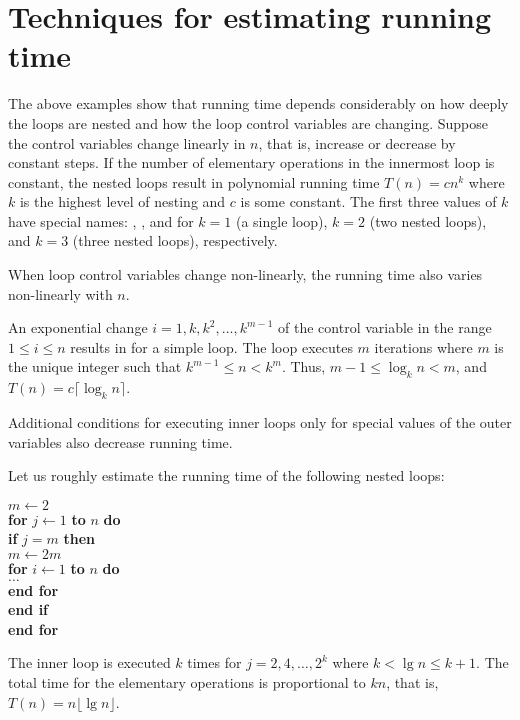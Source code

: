 \chapter{Techniques for estimating running time} %

The above examples show that running time depends considerably on how
deeply the loops are nested and how the loop control variables are
changing. Suppose the control variables change linearly in $n$, that
is, increase or decrease by constant steps. If the number of elementary
operations in the innermost loop is constant, the nested loops result
in polynomial running time $T(n) = c  n^{k}$ where $k$ is
the highest level of nesting and $c$ is some constant. The first three
values of $k$ have special names: , 
,
and  for $k=1$ (a single loop), $k=2$ (two nested
loops), and $k=3$ (three nested loops), respectively.

When loop control variables change non-linearly,
the running time also varies non-linearly with $n$.

\begin{Example} 
An exponential change \(i=1,k,k^2 ,\ldots, k^{m-1}\) of
the control variable  in the
range \(1 \le i \le n\) results in 
for a simple loop. The loop executes $m$ 
iterations where $m$ is the unique integer such that $k^{m-1} \le  n  < k^{m}$. Thus, $m-1 \le \log_{k} n
< m$, and $T(n) = c  \lceil \log_{k} n \rceil$.
\end{Example}
 
Additional conditions for executing inner loops only for special values of 
the outer variables also decrease running time. 

\begin{Boxample}[6]
\label{exm:nest2}
Let us roughly estimate the running time of the following nested loops:
 
\hspace*{.3in}\begin{minipage}{5in}
\Algorbody
{
\(m \leftarrow 2\) \\
\textbf{for} \(j \leftarrow 1\) \textbf{to} \(n\) \textbf{do}\\
\>\textbf{if} \(j = m \) \textbf{then} \\
\>\> \(m \leftarrow 2m\) \\
\>\>\textbf{for} \(i \leftarrow  1\) \textbf{to} \(n\) \textbf{do}\\
\>\>\>$\ldots$  \\
\>\>\textbf{end for} \\
\>\textbf{end if}\\
\textbf{end for}\\
}
\end{minipage}

The inner loop is executed $k$ times for $j=2, 4, \ldots, 2^{k}$
where $k < \lg n \le k+1$. The total time for the elementary operations is 
proportional to $kn$, that is, $T(n)=  n  \lfloor \lg n \rfloor$.    
\end{Boxample}

